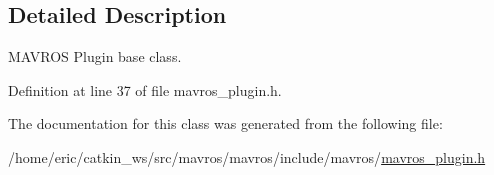 \subsection{Detailed Description}
M\+A\+V\+R\+OS Plugin base class. 

Definition at line 37 of file mavros\+\_\+plugin.\+h.



The documentation for this class was generated from the following file\+:\begin{DoxyCompactItemize}
\item 
/home/eric/catkin\+\_\+ws/src/mavros/mavros/include/mavros/\mbox{\hyperlink{mavros__plugin_8h}{mavros\+\_\+plugin.\+h}}\end{DoxyCompactItemize}
